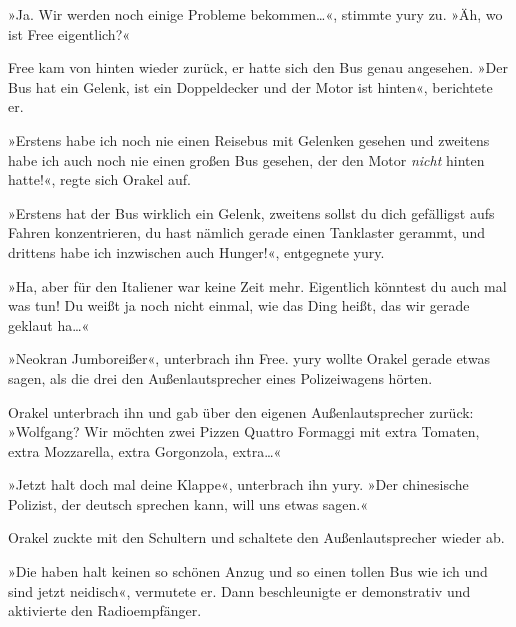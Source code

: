 »Ja. Wir werden noch einige Probleme bekommen…«, stimmte yury zu. »Äh, wo ist Free eigentlich?«

Free kam von hinten wieder zurück, er hatte sich den Bus genau angesehen. »Der Bus hat ein Gelenk, ist ein Doppeldecker und der Motor ist hinten«, berichtete er.

»Erstens habe ich noch nie einen Reisebus mit Gelenken gesehen und zweitens habe ich auch noch nie einen großen Bus gesehen, der den Motor \emph{nicht} hinten hatte!«, regte sich Orakel auf.

»Erstens hat der Bus wirklich ein Gelenk, zweitens sollst du dich gefälligst aufs Fahren konzentrieren, du hast nämlich gerade einen Tanklaster gerammt, und drittens habe ich inzwischen auch Hunger!«, entgegnete yury.

»Ha, aber für den Italiener war keine Zeit mehr. Eigentlich könntest du auch mal was tun! Du weißt ja noch nicht einmal, wie das Ding heißt, das wir gerade geklaut ha…«

»Neokran Jumboreißer«, unterbrach ihn Free. yury wollte Orakel gerade etwas sagen, als die drei den Außenlautsprecher eines Polizeiwagens hörten.


Orakel unterbrach ihn und gab über den eigenen Außenlautsprecher zurück: »Wolfgang? Wir möchten zwei Pizzen Quattro Formaggi mit extra Tomaten, extra Mozzarella, extra Gorgonzola, extra…«

»Jetzt halt doch mal deine Klappe«, unterbrach ihn yury. »Der chinesische Polizist, der deutsch sprechen kann, will uns etwas sagen.«


Orakel zuckte mit den Schultern und schaltete den Außenlautsprecher wieder ab.

»Die haben halt keinen so schönen Anzug und so einen tollen Bus wie ich und sind jetzt neidisch«, vermutete er. Dann beschleunigte er demonstrativ und aktivierte den Radioempfänger.


